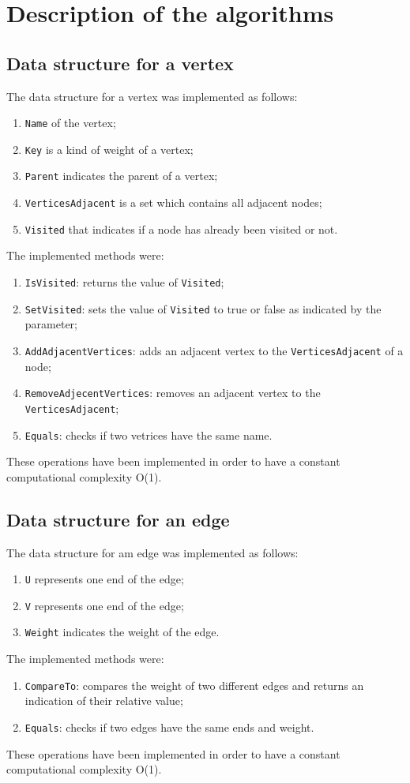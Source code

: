 \section{Description of the algorithms}

\subsection*{Data structure for a vertex}
The data structure for a vertex was implemented as follows:
\begin{enumerate}
    \item \verb|Name| of the vertex;
    \item \verb|Key| is a kind of weight of a vertex;
    \item \verb|Parent| indicates the parent of a vertex;
    \item \verb|VerticesAdjacent| is a set which contains all adjacent nodes; 
    \item \verb|Visited| that indicates if a node has already been visited or not.
\end{enumerate}
\noindent
The implemented methods were:
\begin{enumerate}
    \item \verb|IsVisited|: returns the value of \verb|Visited|;
    \item \verb|SetVisited|: sets the value of \verb|Visited| to true or false as indicated by the parameter;
    \item \verb|AddAdjacentVertices|: adds an adjacent vertex to the \verb|VerticesAdjacent| of a node;
    \item \verb|RemoveAdjecentVertices|: removes an adjacent vertex to the \verb|VerticesAdjacent|;
    \item \verb|Equals|: checks if two vetrices have the same name.
\end{enumerate}
These operations have been implemented in order to have a constant computational complexity O(1).

\subsection*{Data structure for an edge}
The data structure for am edge was implemented as follows:
\begin{enumerate}
    \item \verb|U| represents one end of the edge;
    \item \verb|V| represents one end of the edge;
    \item \verb|Weight| indicates the weight of the edge.
    \end{enumerate}
\noindent
The implemented methods were:
\begin{enumerate}
    \item \verb|CompareTo|: compares the weight of two different edges and returns an indication of their relative value;
    \item \verb|Equals|: checks if two edges have the same ends and weight.
\end{enumerate}
These operations have been implemented in order to have a constant computational complexity O(1).

